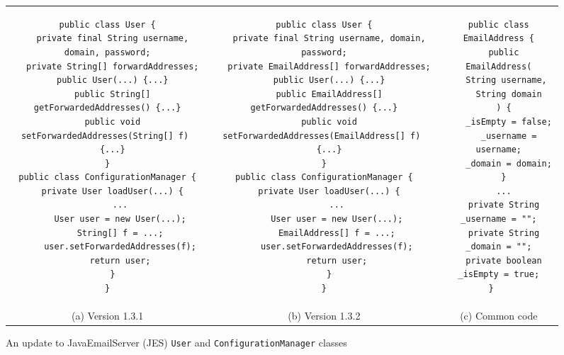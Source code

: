\documentclass[natbib]{sigplanconf}
\newcommand{\code}[1]{\lstinline|#1|\xspace}
\begin{document}
\begin{figure}[t]
\begin{tabular}{c|c|c}
\begin{minipage}{2.4in}
\begin{lstlisting}
public class User {
  private final String username, domain, password;
  private String[] forwardAddresses;
  public User(...) {...}
  public String[] getForwardedAddresses() {...}
  public void setForwardedAddresses(String[] f) 
  {...}
}
public class ConfigurationManager {
  private User loadUser(...) {
     ...
     User user = new User(...);
     String[] f = ...;
     user.setForwardedAddresses(f);
     return user;
  }
}
\end{lstlisting}
\end{minipage} &
\begin{minipage}{2.5in}
\begin{lstlisting}
public class User {
  private final String username, domain, password;
  private EmailAddress[] forwardAddresses;
  public User(...) {...}
  public EmailAddress[] getForwardedAddresses() {...}
  public void setForwardedAddresses(EmailAddress[] f) 
  {...}
}
public class ConfigurationManager {
  private User loadUser(...) {
     ...
     User user = new User(...);
     EmailAddress[] f = ...;
     user.setForwardedAddresses(f);
     return user;
  }
}
\end{lstlisting}
\end{minipage} &
\begin{minipage}{1.2in}
\begin{lstlisting}
public class EmailAddress {
  public EmailAddress(
    String username, 
    String domain
  ) {
    _isEmpty = false;
    _username = username;
    _domain = domain;
  }
  ...
  private String _username = "";
  private String _domain = "";
  private boolean _isEmpty = true;
}   
\end{lstlisting}
\end{minipage} \\
(a) Version 1.3.1 &
(b) Version 1.3.2 &
(c) Common code \\
\end{tabular}
\caption{An update to JavaEmailServer (JES) \code{User} and
  \code{ConfigurationManager} classes}
\label{fig:email-example}
\end{figure}
\end{document}
